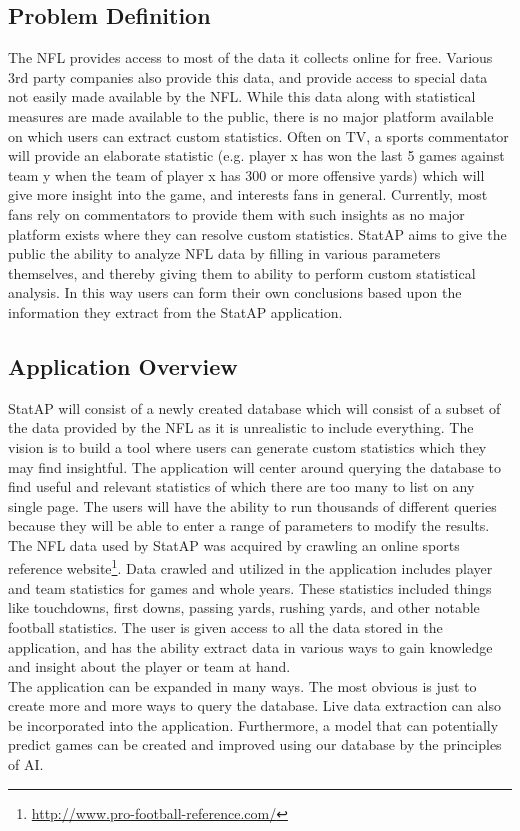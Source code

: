 \documentclass[12pt,letterpaper]{article}
\begin{document}
\subsection{Problem Definition}
The NFL provides access to most of the data it collects online for free. Various 3rd party companies also provide this data, and provide access to special data not easily made available by the NFL. While this data along with statistical measures are made available to the public, there is no major platform available on which users can extract custom statistics. Often on TV, a sports commentator will provide an elaborate statistic (e.g. player x has won the last 5 games against team y when the team of player x has 300 or more offensive yards) which will give more insight into the game, and interests fans in general. Currently, most fans rely on commentators to provide them with such insights as no major platform exists where they can resolve custom statistics. StatAP aims to give the public the ability to analyze NFL data by filling in various parameters themselves, and thereby giving them to ability to perform custom statistical analysis. In this way users can form their own conclusions based upon the information they extract from the StatAP application.

\subsection{Application Overview}
StatAP will consist of a newly created database which will consist of a subset of the data provided by the NFL as it is unrealistic to include everything. The vision is to build a tool where users can generate custom statistics which they may find insightful. The application will center around querying the database to find useful and relevant statistics of which there are too many to list on any single page. The users will have the ability to run thousands of different queries because they will be able to enter a range of parameters to modify the results. \\
The NFL data used by StatAP was acquired by crawling an online sports reference website\footnote{\url{http://www.pro-football-reference.com/}}. Data crawled and utilized in the application includes player and team statistics for games and whole years. These statistics included things like touchdowns, first downs, passing yards, rushing yards, and other notable football statistics. The user is given access to all the data stored in the application, and has the ability extract data in various ways to gain knowledge and insight about the player or team at hand. \\
The application can be expanded in many ways. The most obvious is just to create more and more ways to query the database. Live data extraction can also be incorporated into the application. Furthermore, a model that can potentially predict games can be created and improved using our database by the principles of AI.
\clearpage\null
\end{document}
